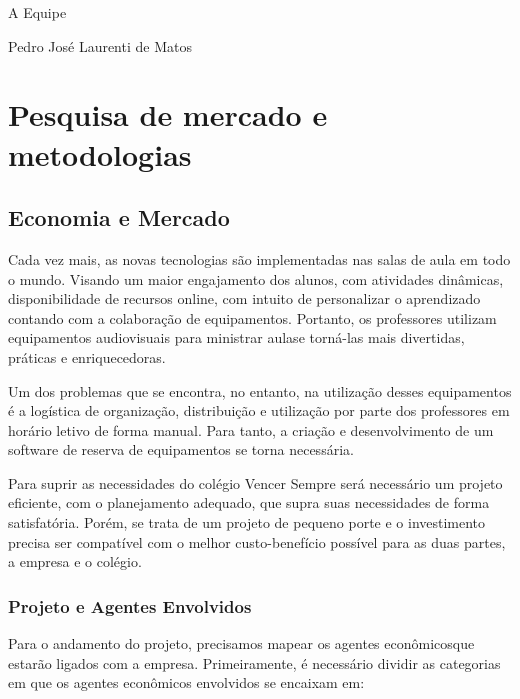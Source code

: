 \documentclass[
	12pt,				%
	openright,			%
	twoside,			%
	a4paper,			%
	english,			%
	french,				%
	spanish,			%
	brazil				%
	]{abntex2}
\begin{document}
A Equipe

Pedro José Laurenti de Matos

\part{Pesquisa de mercado e metodologias}



\chapter{Economia e Mercado}\label{cap_trabalho_academico}

Cada vez mais, as novas tecnologias são implementadas nas salas de aula em
todo o mundo. Visando um maior engajamento dos alunos, com atividades
dinâmicas, disponibilidade de recursos online, com intuito de personalizar o
aprendizado contando com a colaboração de equipamentos. Portanto, os
professores utilizam equipamentos audiovisuais para ministrar aulase torná-las mais
divertidas, práticas e enriquecedoras.

Um dos problemas que se encontra, no entanto, na utilização desses
equipamentos é a logística de organização, distribuição e utilização por parte dos
professores em horário letivo de forma manual. Para tanto, a criação e
desenvolvimento de um software de reserva de equipamentos se torna necessária.

Para suprir as necessidades do colégio Vencer Sempre será necessário um
projeto eficiente, com o planejamento adequado, que supra suas necessidades de
forma satisfatória. Porém, se trata de um projeto de pequeno porte e o investimento
precisa ser compatível com o melhor custo-benefício possível para as duas partes,
a empresa e o colégio.

\section{Projeto e Agentes Envolvidos}

Para o andamento do projeto, precisamos mapear os agentes econômicosque
estarão ligados com a empresa. Primeiramente, é necessário dividir as categorias
em que os agentes econômicos envolvidos se encaixam em:
\end{document}
